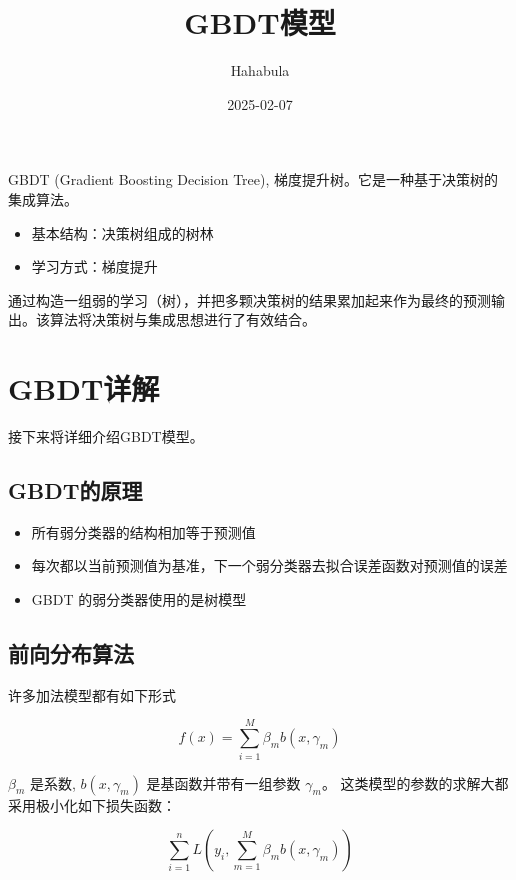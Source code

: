 \documentclass[
  letterpaper,
  DIV=11,
  numbers=noendperiod]{scrartcl}
\title{GBDT模型}
\author{Hahabula}
\date{2025-02-07}
\providecommand{\tightlist}{%
  \setlength{\itemsep}{0pt}\setlength{\parskip}{0pt}}\usepackage{longtable,booktabs,array}
\renewcommand*\contentsname{Table of contents}
\newcommand\contentsname{Table of contents}
\begin{document}
\maketitle


\renewcommand*\contentsname{目录}
{
\hypersetup{linkcolor=}
\setcounter{tocdepth}{3}
\tableofcontents
}

GBDT (Gradient Boosting Decision Tree),
梯度提升树。它是一种基于决策树的集成算法。

\begin{itemize}
\item
  基本结构：决策树组成的树林
\item
  学习方式：梯度提升
\end{itemize}

通过构造一组弱的学习（树），并把多颗决策树的结果累加起来作为最终的预测输出。该算法将决策树与集成思想进行了有效结合。

\section{GBDT详解}\label{gbdtux8be6ux89e3}

接下来将详细介绍GBDT模型。

\subsection{GBDT的原理}\label{gbdtux7684ux539fux7406}

\begin{itemize}
\tightlist
\item
  所有弱分类器的结构相加等于预测值
\item
  每次都以当前预测值为基准，下一个弱分类器去拟合误差函数对预测值的误差
\item
  GBDT 的弱分类器使用的是树模型
\end{itemize}

\subsection{前向分布算法}\label{sec-ux524dux5411ux5206ux5e03ux7b97ux6cd5}

许多加法模型都有如下形式

\[
f(x)=\sum_{i=1}^M\beta_m b(x,\gamma_m)
\]

\(\beta_m\) 是系数, \(b(x,\gamma_m)\) 是基函数并带有一组参数
\(\gamma_m\)。 这类模型的参数的求解大都采用极小化如下损失函数：

\[
\sum_{i=1}^nL(y_i,\sum_{m=1}^M\beta_mb(x,\gamma_m))
\]
\end{document}
